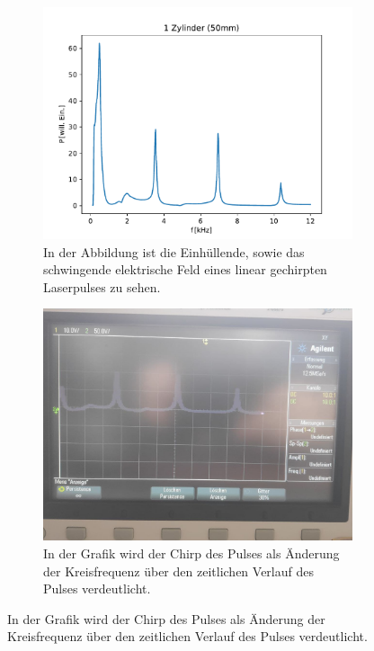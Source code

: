         \begin{figure}
            \centering
            \begin{subfigure}[b]{0.45\textwidth}
                \centering
                \includegraphics[scale=0.4]{./pictures/1_Zylinder_50mm.pdf}
                \caption{In der Abbildung ist die Einhüllende, sowie das schwingende elektrische Feld eines linear gechirpten Laserpulses zu sehen.}
            \end{subfigure}
            \hfill
            \centering
            \begin{subfigure}[b]{0.45\textwidth}
                \centering
                \includegraphics[scale=0.13]{./pictures/1_Zylinder.jpg}
                \caption{In der Grafik wird der Chirp des Pulses als Änderung der Kreisfrequenz über den zeitlichen Verlauf des Pulses verdeutlicht.}
            \end{subfigure}


\end{figure}

